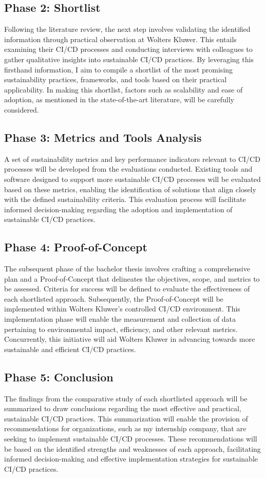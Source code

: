 \subsection{Phase 2: Shortlist}
Following the literature review, the next step involves validating the identified information through practical observation at Wolters Kluwer. This entails examining their CI/CD processes and conducting interviews with colleagues to gather qualitative insights into sustainable CI/CD practices. By leveraging this firsthand information, I aim to compile a shortlist of the most promising sustainability practices, frameworks, and tools based on their practical applicability. In making this shortlist, factors such as scalability and ease of adoption, as mentioned in the state-of-the-art literature, will be carefully considered.

\subsection{Phase 3: Metrics and Tools Analysis}
A set of sustainability metrics and key performance indicators relevant to CI/CD processes will be developed from the evaluations conducted. Existing tools and software designed to support more sustainable CI/CD processes will be evaluated based on these metrics, enabling the identification of solutions that align closely with the defined sustainability criteria. This evaluation process will facilitate informed decision-making regarding the adoption and implementation of sustainable CI/CD practices.

\subsection{Phase 4: Proof-of-Concept}
The subsequent phase of the bachelor thesis involves crafting a comprehensive plan and a Proof-of-Concept that delineates the objectives, scope, and metrics to be assessed. Criteria for success will be defined to evaluate the effectiveness of each shortlisted approach. Subsequently, the Proof-of-Concept will be implemented within Wolters Kluwer's controlled CI/CD environment. This implementation phase will enable the measurement and collection of data pertaining to environmental impact, efficiency, and other relevant metrics. Concurrently, this initiative will aid Wolters Kluwer in advancing towards more sustainable and efficient CI/CD practices.

\subsection{Phase 5: Conclusion}
The findings from the comparative study of each shortlisted approach will be summarized to draw conclusions regarding the most effective and practical, sustainable CI/CD practices. This summarization will enable the provision of recommendations for organizations, such as my internship company, that are seeking to implement sustainable CI/CD processes. These recommendations will be based on the identified strengths and weaknesses of each approach, facilitating informed decision-making and effective implementation strategies for sustainable CI/CD practices.

